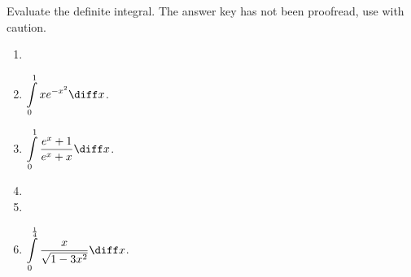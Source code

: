 Evaluate the definite integral. The answer key has not been proofread, use with caution.
\begin{enumerate}[ref={\fcProblemRef}]
\item 
\item $\displaystyle\int\limits_{0}^{1}xe^{-x^2} \diff x$.

\item $\displaystyle\int\limits_{0}^{1}\frac{e^x+1}{e^x+x} \diff x$.

\item 
\item 
\item $\displaystyle\int\limits_{0}^{\frac{1}4}\frac{x }{\sqrt{1-3x^2}}\diff x$.


\end{enumerate}
